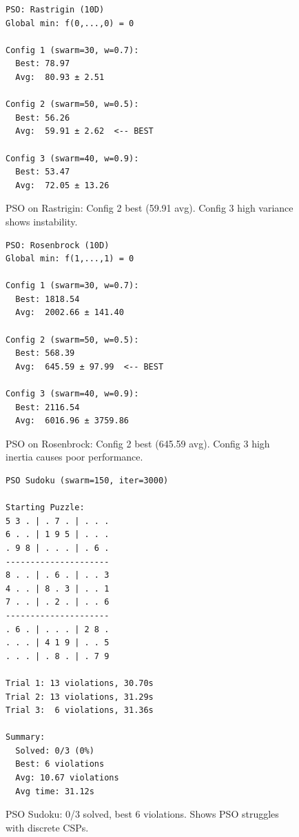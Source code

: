 \documentclass[letterpaper]{article}
\begin{document}
\begin{figure}[h]
\begin{scriptsize}
\begin{verbatim}
PSO: Rastrigin (10D)
Global min: f(0,...,0) = 0

Config 1 (swarm=30, w=0.7):
  Best: 78.97
  Avg:  80.93 ± 2.51

Config 2 (swarm=50, w=0.5):
  Best: 56.26
  Avg:  59.91 ± 2.62  <-- BEST

Config 3 (swarm=40, w=0.9):
  Best: 53.47
  Avg:  72.05 ± 13.26
\end{verbatim}
\end{scriptsize}
\caption{PSO on Rastrigin: Config 2 best (59.91 avg). Config 3 high variance shows instability.}
\label{fig:pso-rastrigin}
\end{figure}

\begin{figure}[h]
\begin{scriptsize}
\begin{verbatim}
PSO: Rosenbrock (10D)
Global min: f(1,...,1) = 0

Config 1 (swarm=30, w=0.7):
  Best: 1818.54
  Avg:  2002.66 ± 141.40

Config 2 (swarm=50, w=0.5):
  Best: 568.39
  Avg:  645.59 ± 97.99  <-- BEST

Config 3 (swarm=40, w=0.9):
  Best: 2116.54
  Avg:  6016.96 ± 3759.86
\end{verbatim}
\end{scriptsize}
\caption{PSO on Rosenbrock: Config 2 best (645.59 avg). Config 3 high inertia causes poor performance.}
\label{fig:pso-rosenbrock}
\end{figure}

\begin{figure}[h]
\begin{scriptsize}
\begin{verbatim}
PSO Sudoku (swarm=150, iter=3000)

Starting Puzzle:
5 3 . | . 7 . | . . .
6 . . | 1 9 5 | . . .
. 9 8 | . . . | . 6 .
---------------------
8 . . | . 6 . | . . 3
4 . . | 8 . 3 | . . 1
7 . . | . 2 . | . . 6
---------------------
. 6 . | . . . | 2 8 .
. . . | 4 1 9 | . . 5
. . . | . 8 . | . 7 9

Trial 1: 13 violations, 30.70s
Trial 2: 13 violations, 31.29s
Trial 3:  6 violations, 31.36s

Summary:
  Solved: 0/3 (0%)
  Best: 6 violations
  Avg: 10.67 violations
  Avg time: 31.12s
\end{verbatim}
\end{scriptsize}
\caption{PSO Sudoku: 0/3 solved, best 6 violations. Shows PSO struggles with discrete CSPs.}
\label{fig:pso-sudoku}
\end{figure}

\clearpage


\end{document}

